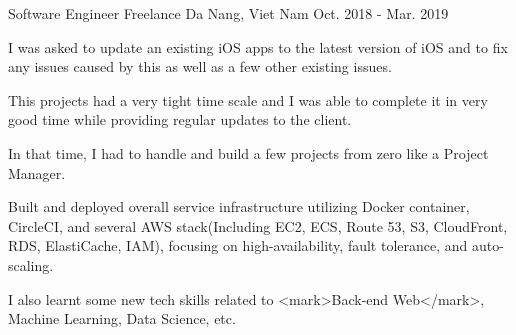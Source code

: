 \begin{cventries}
  \cventry
    {Software Engineer} %
    {Freelance} %
    {Da Nang, Viet Nam} %
    {Oct. 2018 - Mar. 2019} %
    {
      \begin{cvitems} %
        \item {I was asked to update an existing iOS apps to the latest version of iOS and to fix any issues caused by this as well as a few other existing issues.}
        \item {This projects had a very tight time scale and I was able to complete it in very good time while providing regular updates to the client.}
        \item {In that time, I had to handle and build a few projects from zero like a Project Manager.}
        \item {Built and deployed overall service infrastructure utilizing Docker container, CircleCI, and several AWS stack(Including EC2, ECS, Route 53, S3, CloudFront, RDS, ElastiCache, IAM), focusing on high-availability, fault tolerance, and auto-scaling.}
        \item {I also learnt some new tech skills related to <mark>Back-end Web</mark>, Machine Learning, Data Science, etc.}
      \end{cvitems}
    }


\end{cventries}
